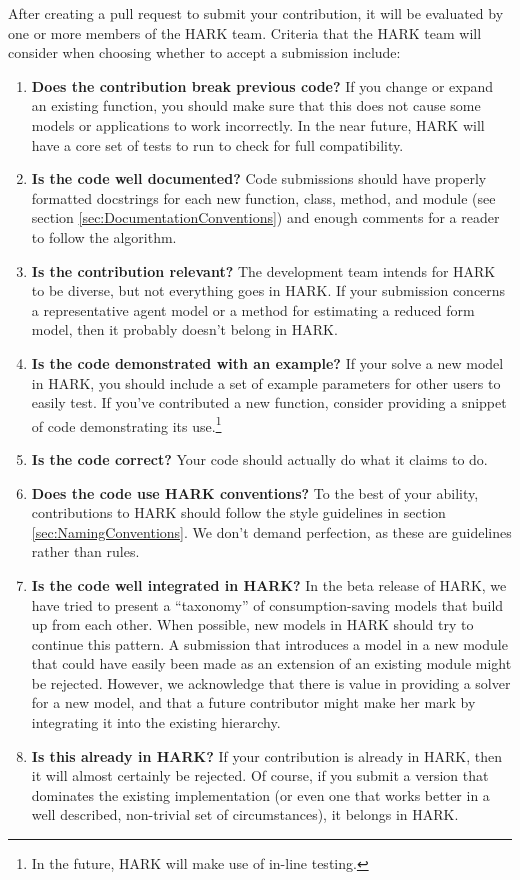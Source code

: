 \documentclass[12pt,titlepage,letterpaper]{econtex}
\begin{document}
After creating a pull request to submit your contribution, it will be evaluated by one or more members of the HARK team.  Criteria that the HARK team will consider when choosing whether to accept a submission include:
\begin{enumerate}
\item \textbf{Does the contribution break previous code?} If you change or expand an existing function, you should make sure that this does not cause some models or applications to work incorrectly.  In the near future, HARK will have a core set of tests to run to check for full compatibility.

\item \textbf{Is the code well documented?} Code submissions should have properly formatted docstrings for each new function, class, method, and module (see section \ref{sec:DocumentationConventions}) and enough comments for a reader to follow the algorithm.

\item \textbf{Is the contribution relevant?} The development team intends for HARK to be diverse, but not everything goes in HARK.  If your submission concerns a representative agent model or a method for estimating a reduced form model, then it probably doesn't belong in HARK.

\item \textbf{Is the code demonstrated with an example?} If your solve a new model in HARK, you should include a set of example parameters for other users to easily test.  If you've contributed a new function, consider providing a snippet of code demonstrating its use.\footnote{In the future, HARK will make use of in-line testing.}

\item \textbf{Is the code correct?} Your code should actually do what it claims to do.

\item \textbf{Does the code use HARK conventions?} To the best of your ability, contributions to HARK should follow the style guidelines in section \ref{sec:NamingConventions}.  We don't demand perfection, as these are guidelines rather than rules.

\item \textbf{Is the code well integrated in HARK?} In the beta release of HARK, we have tried to present a ``taxonomy'' of consumption-saving models that build up from each other.  When possible, new models in HARK should try to continue this pattern.  A submission that introduces a model in a new module that could have easily been made as an extension of an existing module might be rejected.  However, we acknowledge that there is value in providing a solver for a new model, and that a future contributor might make her mark by integrating it into the existing hierarchy.

\item \textbf{Is this already in HARK?} If your contribution is already in HARK, then it will almost certainly be rejected.  Of course, if you submit a version that dominates the existing implementation (or even one that works better in a well described, non-trivial set of circumstances), it belongs in HARK.
\end{enumerate}
\end{document}
